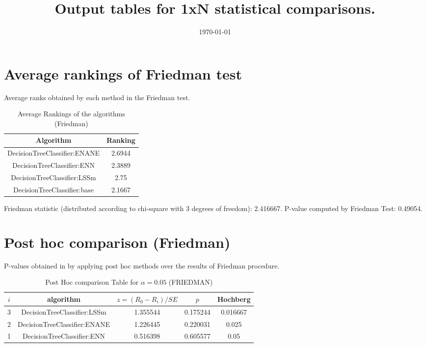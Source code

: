 \documentclass[a4paper,10pt]{article}
\title{Output tables for 1xN statistical comparisons.}
\author{}
\date{\today}
\begin{document}
\begin{landscape}
\pagestyle{empty}
\maketitle
\thispagestyle{empty}

\section{Average rankings of Friedman test}


Average ranks obtained by each method in the Friedman test.

\begin{table}[!htp]
\centering
\begin{tabular}{|c|c|}\hline
Algorithm&Ranking\\\hline
DecisionTreeClassifier:ENANE&2.6944\\DecisionTreeClassifier:ENN&2.3889\\DecisionTreeClassifier:LSSm&2.75\\DecisionTreeClassifier:base&2.1667\\\hline\end{tabular}
\caption{Average Rankings of the algorithms (Friedman)}
\end{table}

Friedman statistic (distributed according to chi-square with 3 degrees of freedom): 2.416667. \newline P-value computed by Friedman Test: 0.49054.\newline


\newpage

\section{Post hoc comparison (Friedman)}


P-values obtained in by applying post hoc methods over the results of Friedman procedure.

\begin{table}[!htp]
\centering\footnotesize
\begin{tabular}{ccccc}
$i$&algorithm&$z=(R_0 - R_i)/SE$&$p$&Hochberg \\
\hline3&DecisionTreeClassifier:LSSm&1.355544&0.175244&0.016667\\2&DecisionTreeClassifier:ENANE&1.226445&0.220031&0.025\\1&DecisionTreeClassifier:ENN&0.516398&0.605577&0.05\\\hline
\end{tabular}
\caption{Post Hoc comparison Table for $\alpha=0.05$ (FRIEDMAN)}
\end{table}
\newpage


\end{landscape}
\end{document}

